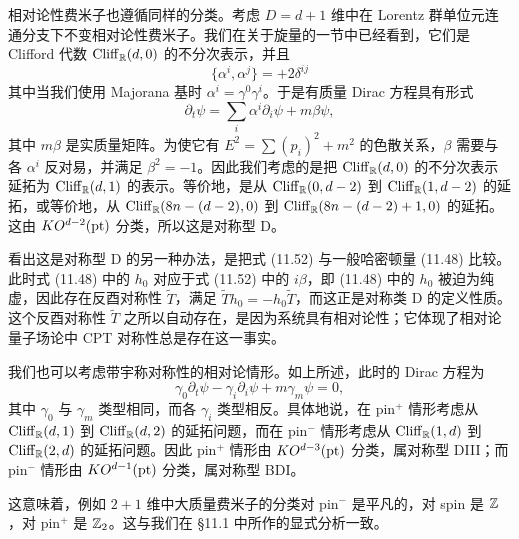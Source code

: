 相对论性费米子也遵循同样的分类。考虑 $D=d+1$ 维中在 Lorentz 群单位元连通分支下不变相对论性费米子。我们在关于旋量的一节中已经看到，它们是 Clifford 代数 $\mathrm{Cliff}_{\mathbb{R}}(d,0)$ 的不分次表示，并且
\begin{equation}
\{\alpha^i,\alpha^j\}=+2\delta^{ij} \tag{11.51}
\end{equation}
其中当我们使用 Majorana 基时 $\alpha^i=\gamma^0\gamma^i$。于是有质量 Dirac 方程具有形式
\begin{equation}
\partial_t\psi=\sum_i\alpha^i\partial_i\psi+m\beta\psi, \tag{11.52}
\end{equation}
其中 $m\beta$ 是实质量矩阵。为使它有 $E^2=\sum(p_i)^2+m^2$ 的色散关系，$\beta$ 需要与各 $\alpha^i$ 反对易，并满足 $\beta^2=-1$。因此我们考虑的是把 $\mathrm{Cliff}_{\mathbb{R}}(d,0)$ 的不分次表示延拓为 $\mathrm{Cliff}_{\mathbb{R}}(d,1)$ 的表示。等价地，是从 $\mathrm{Cliff}_{\mathbb{R}}(0,d-2)$ 到 $\mathrm{Cliff}_{\mathbb{R}}(1,d-2)$ 的延拓，或等价地，从 $\mathrm{Cliff}_{\mathbb{R}}(8n-(d-2),0)$ 到 $\mathrm{Cliff}_{\mathbb{R}}(8n-(d-2)+1,0)$ 的延拓。这由 $KO^{d-2}(\mathrm{pt})$ 分类，所以这是对称型 D。

看出这是对称型 D 的另一种办法，是把式 (11.52) 与一般哈密顿量 (11.48) 比较。此时式 (11.48) 中的 $h_0$ 对应于式 (11.52) 中的 $i\beta$，即 (11.48) 中的 $h_0$ 被迫为纯虚，因此存在反酉对称性 $\tilde T$，满足 $\tilde Th_0=-h_0\tilde T$，而这正是对称类 D 的定义性质。这个反酉对称性 $\tilde T$ 之所以自动存在，是因为系统具有相对论性；它体现了相对论量子场论中 CPT 对称性总是存在这一事实。

我们也可以考虑带宇称对称性的相对论情形。如上所述，此时的 Dirac 方程为
\begin{equation}
\gamma_0\partial_t\psi-\gamma_i\partial_i\psi+m\gamma_m\psi=0, \tag{11.53}
\end{equation}
其中 $\gamma_0$ 与 $\gamma_m$ 类型相同，而各 $\gamma_i$ 类型相反。具体地说，在 pin$^+$ 情形考虑从 $\mathrm{Cliff}_{\mathbb{R}}(d,1)$ 到 $\mathrm{Cliff}_{\mathbb{R}}(d,2)$ 的延拓问题，而在 pin$^-$ 情形考虑从 $\mathrm{Cliff}_{\mathbb{R}}(1,d)$ 到 $\mathrm{Cliff}_{\mathbb{R}}(2,d)$ 的延拓问题。因此 pin$^+$ 情形由 $KO^{d-3}(\mathrm{pt})$ 分类，属对称型 DIII；而 pin$^-$ 情形由 $KO^{d-1}(\mathrm{pt})$ 分类，属对称型 BDI。

这意味着，例如 $2+1$ 维中大质量费米子的分类对 pin$^-$ 是平凡的，对 spin 是 $\mathbb{Z}$，对 pin$^+$ 是 $\mathbb{Z}_2$。这与我们在 §11.1 中所作的显式分析一致。


